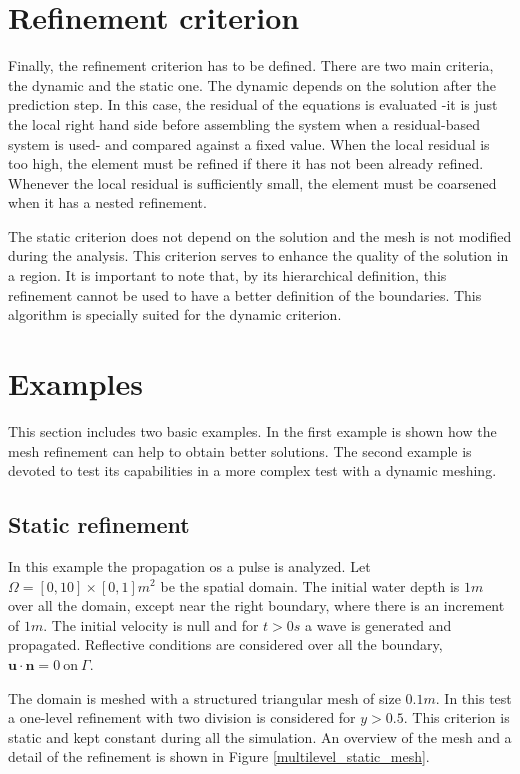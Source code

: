 \section{Refinement criterion}

Finally, the refinement criterion has to be defined. There are two main criteria, the dynamic and the static one. The dynamic depends on the solution after the prediction step. In this case, the residual of the equations is evaluated -it is just the local right hand side before assembling the system when a residual-based system is used- and compared against a fixed value. When the local residual is too high, the element must be refined if there it has not been already refined. Whenever the local residual is sufficiently small, the element must be coarsened when it has a nested refinement.

The static criterion does not depend on the solution and the mesh is not modified during the analysis. This criterion serves to enhance the quality of the solution in a region. It is important to note that, by its hierarchical definition,  this refinement cannot be used to have a better definition of the boundaries. This algorithm is specially suited for the dynamic criterion.


\section{Examples}


This section includes two basic examples. In the first example is shown how the mesh refinement can help to obtain better solutions. The second example is devoted to test its capabilities in a more complex test with a dynamic meshing.


\subsection{Static refinement}


In this example the propagation os a pulse is analyzed. Let $\Omega=[0,10]\times[0,1]m^2$ be the spatial domain. The initial water depth is $1m$ over all the domain, except near the right boundary, where there is an increment of $1m$.
The initial velocity is null and for $t>0s$ a wave is generated and propagated. Reflective conditions are considered over all the boundary, $\mathbf{u} \cdot \mathbf{n} = 0\ \text{on}\ \Gamma$.

The domain is meshed with a structured triangular mesh of size $0.1m$. In this test a one-level refinement with two division is considered for $y>0.5$. This criterion is static and kept constant during all the simulation. An overview of the mesh and a detail of the refinement is shown in Figure \ref{multilevel_static_mesh}.

